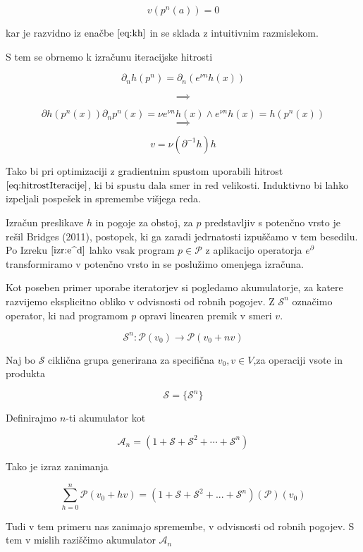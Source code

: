 \documentclass{article}
\newcommand{\Shift}{\mathcal{S}}
\newcommand{\dP}{\mathcal{P}}
\newcommand{\D}{\partial}
\begin{document}
  \begin{equation}
  v(p^n(a))=0
  \end{equation}
  
  kar je razvidno iz enačbe $\eqref{eq:kh}$ in se sklada z intuitivnim razmislekom.
  
  S tem se obrnemo k izračunu iteracijske hitrosti
 
  $$\D_nh(p^n)=\D_n(e^{\nu n}h(x))$$
  
  $$\implies$$
  
  $$\D h(p^n(x))\D_np^n(x)=\nu e^{\nu n}h(x) \land e^{\nu n}h(x)=h(p^n(x))$$
  $$\implies$$
  
  \begin{equation}\label{eq:hitrostIteracije}
  v=\nu(\D^{-1}h)h
  \end{equation}
  
  Tako bi pri optimizaciji z gradientnim spustom uporabili hitrost $\eqref{eq:hitrostIteracije}$, ki bi spustu dala smer in red velikosti. Induktivno bi lahko izpeljali pospešek in spremembe višjega reda.
  
  Izračun preslikave $h$ in pogoje za obstoj, za $p$ predstavljiv s potenčno vrsto je rešil Bridges (2011), postopek, ki ga zaradi jedrnatosti izpuščamo v tem besedilu. Po Izreku $\eqref{izr:e^d}$ lahko vsak program $p\in\dP$ z aplikacijo operatorja $e^\D$ transformiramo v potenčno vrsto in se poslužimo omenjega izračuna.
  
   Kot poseben primer uporabe iteratorjev si pogledamo akumulatorje, za katere razvijemo eksplicitno obliko v odvisnosti od robnih pogojev. Z $\Shift^n$ označimo operator, ki nad programom $p$ opravi linearen premik v smeri $v$.
   
   \begin{equation}
   \Shift^n:\dP(v_0)\to \dP(v_0+nv)
   \end{equation}
    
    Naj bo $\Shift$ ciklična grupa generirana za specifična $v_0,v\in V$,za operaciji vsote in produkta
   
   $$\Shift=\{\Shift^n\}$$
   
   Definirajmo $n$-ti akumulator kot
   
   $$\mathcal{A}_n=(1+\Shift+\Shift^2+\cdots+\Shift^n)$$
   
   Tako je izraz zanimanja
   
   $$\sum\limits_{h=0}^{n}\dP(v_0+hv)=(1+\Shift+\Shift^2+...+\Shift^n)(\dP)(v_0)$$
   
   Tudi v tem primeru nas zanimajo spremembe, v odvisnosti od robnih pogojev. S tem v mislih raziščimo akumulator $\mathcal{A}_n$
   
\end{document}
